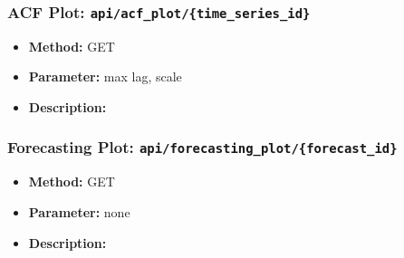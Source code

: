 \documentclass[11pt, a4paper]{article}
\begin{document}
\subsubsection*{ACF Plot: \texttt{api/acf\_plot/\{time\_series\_id\}}}
\begin{itemize}
 \item[] \textbf{Method:} GET 
 \item[] \textbf{Parameter:} max lag, scale
 \item[] \textbf{Description:} 
\end{itemize}

\subsubsection*{Forecasting Plot: \texttt{api/forecasting\_plot/\{forecast\_id\}}}
\begin{itemize}
 \item[] \textbf{Method:} GET 
 \item[] \textbf{Parameter:} none
 \item[] \textbf{Description:} 
\end{itemize}
\end{document}
